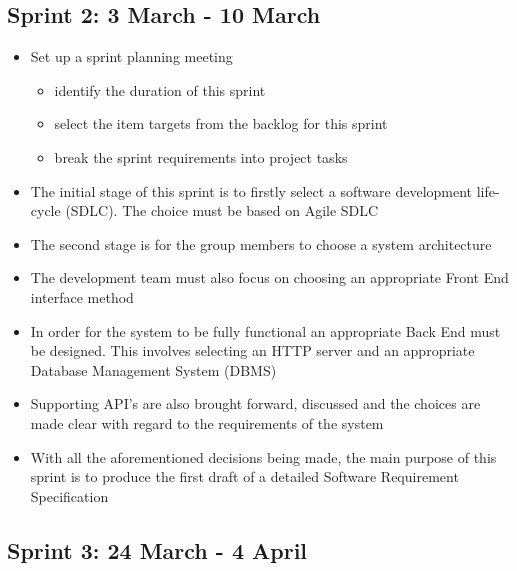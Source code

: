 \documentclass[10pt, a4paper, onecolumn]{scrartcl}
\begin{document}
		\subsection{Sprint 2: 3 March - 10 March}
		
			\begin{itemize}[noitemsep]
				\item Set up a sprint planning meeting
					\begin{itemize}
						\item identify the duration of this sprint
						\item select the item targets from the backlog for this sprint
						\item break the sprint requirements into project tasks
					\end{itemize}
				\item The initial stage of this sprint is to firstly select a software development life-cycle (SDLC). The choice must be based on Agile SDLC
				\item The second stage is for the group members to choose a system architecture
				\item The development team must also focus on choosing an appropriate Front End interface method
				\item In order for the system to be fully functional an appropriate Back End must be designed. This involves selecting an HTTP server and an appropriate Database Management System (DBMS)
				\item Supporting API's are also brought forward, discussed and the choices are made clear with regard to the requirements of the system
				\item With all the aforementioned decisions being made, the main purpose of this sprint is to produce the first draft of a detailed Software Requirement Specification				
			\end{itemize}
		
		\subsection{Sprint 3: 24 March - 4 April}
				
\end{document}
